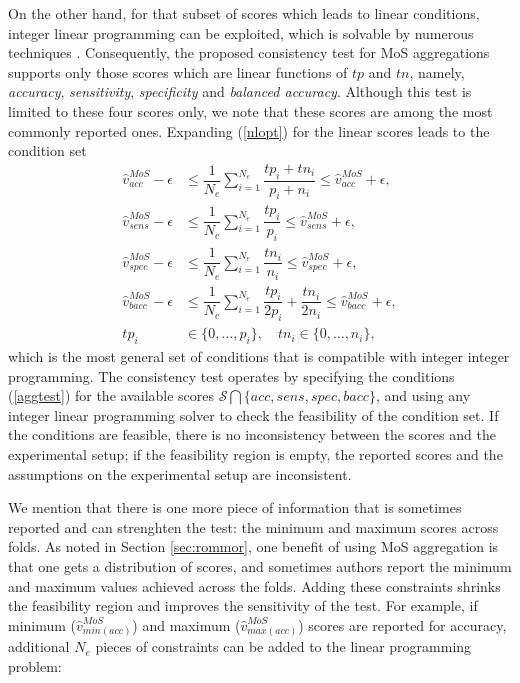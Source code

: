 \documentclass[3p, times]{elsarticle}
\begin{document}
On the other hand, for that subset of scores which leads to linear conditions, integer linear programming can be exploited, which is solvable by numerous techniques \cite{ip}. Consequently, the proposed consistency test for MoS aggregations supports only those scores which are linear functions of $tp$ and $tn$, namely, \emph{accuracy}, \emph{sensitivity}, \emph{specificity} and \emph{balanced accuracy}. Although this test is limited to these four scores only, we note that these scores are among the most commonly reported ones. 
Expanding (\ref{nlopt}) for the linear scores leads to the condition set
\begin{align}
\label{aggtest}
\hat{v}_{acc}^{MoS} - \epsilon & \leq \dfrac{1}{N_e} \sum\limits_{i=1}^{N_e} \dfrac{tp_i + tn_i}{p_i + n_i} \leq \hat{v}_{acc}^{MoS} + \epsilon, \nonumber \\
\hat{v}_{sens}^{MoS} - \epsilon & \leq \dfrac{1}{N_e} \sum\limits_{i=1}^{N_e} \dfrac{tp_i}{p_i} \leq \hat{v}_{sens}^{MoS} + \epsilon, \nonumber \\
\hat{v}_{spec}^{MoS} - \epsilon & \leq \dfrac{1}{N_e} \sum\limits_{i=1}^{N_e} \dfrac{tn_i}{n_i} \leq \hat{v}_{spec}^{MoS} + \epsilon, \nonumber \\
\hat{v}_{bacc}^{MoS} - \epsilon & \leq \dfrac{1}{N_e} \sum\limits_{i=1}^{N_e} \dfrac{tp_i}{2p_i} + \dfrac{tn_i}{2n_i} \leq \hat{v}_{bacc}^{MoS} + \epsilon, \nonumber \\
tp_i &\in \lbrace 0, \dots, p_i\rbrace, \quad tn_i \in \lbrace 0, \dots, n_i\rbrace,
\end{align}
which is the most general set of conditions that is compatible with integer integer programming. The consistency test operates by specifying the conditions (\ref{aggtest}) for the available scores $\mathcal{S} \bigcap \lbrace acc, sens, spec, bacc\rbrace$, and using any integer linear programming solver to check the feasibility of the condition set. If the conditions are feasible, there is no inconsistency between the scores and the experimental setup; if the feasibility region is empty, the reported scores and the assumptions on the experimental setup are inconsistent.


We mention that there is one more piece of information that is sometimes reported and can strenghten the test: the minimum and maximum scores across folds. As noted in Section \ref{sec:rommor}, one benefit of using MoS aggregation is that one gets a distribution of scores, and sometimes authors report the minimum and maximum values achieved across the folds. Adding these constraints shrinks the feasibility region and improves the sensitivity of the test. For example, if minimum ($\hat{v}_{min(acc)}^{MoS}$)  and maximum ($\hat{v}_{max(acc)}^{MoS}$) scores are reported for accuracy, additional $N_e$ pieces of constraints can be added to the linear programming problem:
\end{document}
